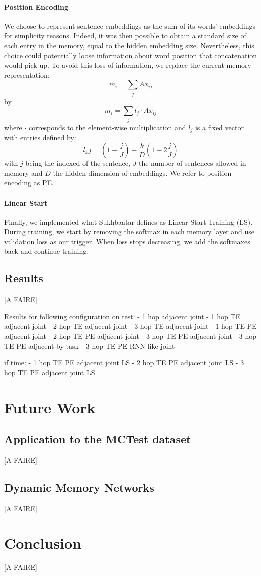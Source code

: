 \documentclass[twoside,11pt]{article}
\begin{document}
\paragraph{Position Encoding}
We choose to represent sentence embeddings as the sum of its words' embeddings for simplicity reasons. Indeed, it was then possible to obtain a standard size of each entry in the memory, equal to the hidden embedding size. Nevertheless, this choice could potentially loose information about word position that concatenation would pick up. To avoid this loss of information, we replace the current memory representation:$$m_i = \sum_j Ax_{ij}$$ by $$m_i = \sum_j l_j\cdot A x_{ij}$$ where $\cdot$ corresponds to the element-wise multiplication and $l_j$ is a fixed vector with entries defined by: $$l_kj = (1-\frac{j}{J})-\frac{k}{D}(1-2\frac{j}{J})$$ with $j$ being the indexed of the sentence, $J$ the number of sentences allowed in memory and $D$ the hidden dimension of embeddings. We refer to position encoding as PE.
\paragraph{Linear Start}
Finally, we implemented what Sukhbaatar defines as Linear Start Training (LS). During training, we start by removing the softmax in each memory layer and use validation loss as our trigger. When loss stops decreasing, we add the softmaxes back and continue training. 

\subsection{Results}

[A FAIRE]

Results for following configuration on test:
- 1 hop adjacent joint
- 1 hop TE adjacent joint
- 2 hop TE adjacent joint
- 3 hop TE adjacent joint
- 1 hop TE PE adjacent joint
- 2 hop TE PE adjacent joint
- 3 hop TE PE adjacent joint
- 3 hop TE PE adjacent by task
- 3 hop TE PE RNN like joint

if time:
- 1 hop TE PE adjacent joint LS
- 2 hop TE PE adjacent joint LS
- 3 hop TE PE adjacent joint LS

\section{Future Work}
\subsection{Application to the MCTest dataset}
[A FAIRE]
\subsection{Dynamic Memory Networks}
[A FAIRE]
\section{Conclusion}
[A FAIRE]
\vskip 0.2in

\end{document}

